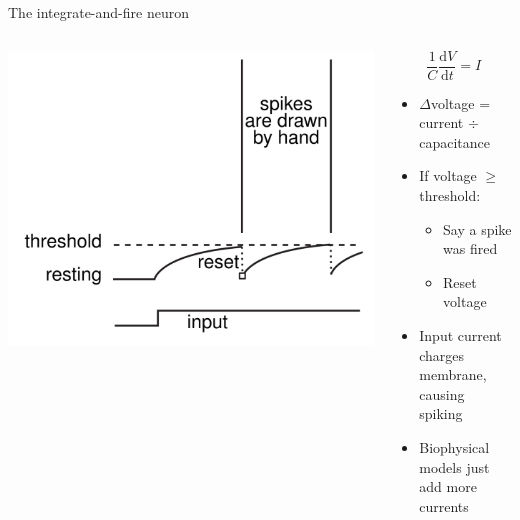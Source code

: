 \documentclass[presentation]{beamer}
\begin{document}
\begin{frame}[label={sec:orgf8ad122}]{The integrate-and-fire neuron}
\begin{columns}
\begin{column}{0.5\columnwidth}
\begin{center}
\includegraphics[width=.9\linewidth]{./ifneuron.png}
\end{center}
\end{column}

\begin{column}{0.5\columnwidth}
\begin{equation}
\frac{1}{C} \frac{\mathrm{d}V}{\mathrm{d}t} = I
\end{equation}

\begin{itemize}
\item \(\Delta\)voltage = current \(\div\) capacitance
\item If voltage \(\geq\) threshold:
\begin{itemize}
\item Say a spike was fired
\item Reset voltage
\end{itemize}
\item Input current charges membrane, causing spiking
\item Biophysical models just add more currents
\end{itemize}
\end{column}
\end{columns}
\end{frame}
\end{document}

